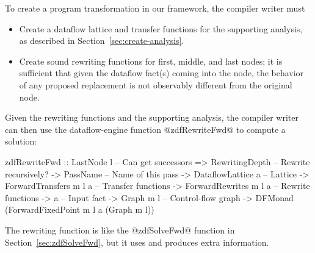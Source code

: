 \documentclass[blockstyle,preprint,nocopyrightspace]{sigplanconf}
\newcommand\secref[1]{Section~\ref{sec:#1}}
\newcommand\seclabel[1]{\label{sec:#1}}
\begin{document}
To create a program transformation in our framework,
the compiler writer must 
\begin{itemize}
\item
Create a dataflow lattice and transfer functions for the supporting
analysis, as described in \secref{create-analysis}. 
\item
Create sound rewriting functions for first, middle, and last nodes;
it is sufficient that given the dataflow fact(s) coming into the node,
the behavior of 
any proposed replacement is not observably different from the original node.
\end{itemize}
Given the rewriting functions and the supporting analysis, the
compiler writer can then use the 
dataflow-engine function @zdfRewriteFwd@ to compute a solution:
\begin{code}
  zdfRewriteFwd 
    :: LastNode l             -- Can get successors
    => RewritingDepth         -- Rewrite recursively?
    -> PassName               -- Name of this pass
    -> DataflowLattice a      -- Lattice
    -> ForwardTransfers m l a -- Transfer functions
    -> ForwardRewrites m l a  -- Rewrite functions
    -> a                      -- Input fact
    -> Graph m l              -- Control-flow graph
    -> DFMonad (ForwardFixedPoint m l a (Graph m l))
\end{code}
The rewriting function is like the @zdfSolveFwd@ function in
\secref{zdfSolveFwd}, but it uses and produces extra
information.\seclabel{engine-truth} 
\end{document}

